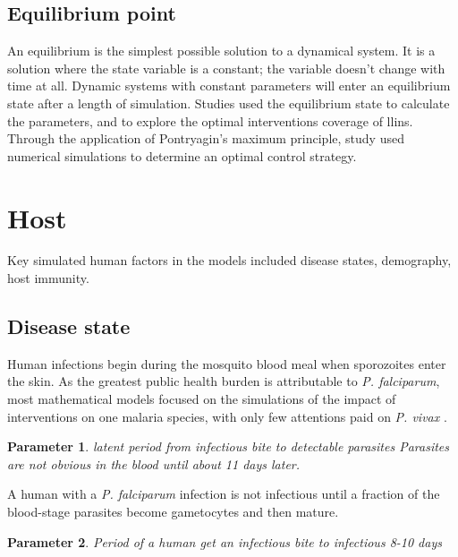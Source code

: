 \documentclass[a4paper, 12pt, twoside]{article}
\newtheorem{parameter}{Parameter}
\begin{document}
\subsection{Equilibrium point}%
\label{sub:equilibrium_point}
An equilibrium is the simplest possible solution to a dynamical system.
It is a solution where the state variable is a constant; the variable doesn't change with time at all.
Dynamic systems with constant parameters will enter an equilibrium state after a length of simulation.
Studies used the equilibrium state to calculate the parameters,  and to explore the optimal interventions coverage of \gls{llins}.
Through the application of Pontryagin’s maximum principle, study used numerical simulations to determine an optimal control strategy\cite{Tchoumi2020}.

\section{Host}%
\label{sec:Host}
Key simulated human factors in the models included disease states, demography, host immunity.

\subsection{Disease state}
Human infections begin during the mosquito blood meal when sporozoites enter the skin.
As the greatest public health burden is attributable to \textit{P. falciparum}, most mathematical models focused on the simulations of the impact of interventions on one malaria species, with only few attentions paid on \textit{P. vivax} \cite{White2018b} . 

\begin{parameter}
  {latent period from infectious bite to detectable parasites}
  Parasites are not obvious in the blood until about 11 days later.
\end{parameter}

A human with a \textit{P. falciparum} infection is not infectious until a fraction of the blood-stage parasites become gametocytes and then mature.

\begin{parameter}
{Period of a human get an infectious bite to infectious}
{8-10 days}
\end{parameter}
\end{document}
